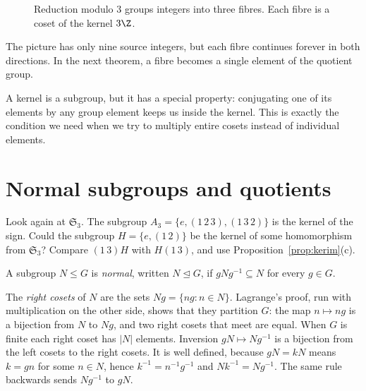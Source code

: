 \begin{figure}[ht]
\centering
{}
\caption{Reduction modulo $3$ groups integers into three fibres. Each fibre is a coset of the kernel $3\Z$.}
\label{fig:kernel-fibres}
\end{figure}

The picture has only nine source integers, but each fibre continues forever in both directions. In the next theorem, a fibre becomes a single element of the quotient group.

A kernel is a subgroup, but it has a special property: conjugating one of its elements by any group element keeps us inside the kernel. This is exactly the condition we need when we try to multiply entire cosets instead of individual elements.

\section{Normal subgroups and quotients}

\begin{think}
Look again at $\mathfrak S_3$. The subgroup $A_3=\{e,(1\,2\,3),(1\,3\,2)\}$ is the kernel of the sign. Could the subgroup $H=\{e,(1\,2)\}$ be the kernel of some homomorphism from $\mathfrak S_3$? Compare $(1\,3)H$ with $H(1\,3)$, and use Proposition~\ref{prop:kerim}(c).
\end{think}

\begin{definition}
A subgroup $N\le G$ is \emph{normal}, written $N\trianglelefteq G$, if $gNg^{-1}\subseteq N$ for every $g\in G$.
\end{definition}

The \emph{right cosets} of $N$ are the sets $Ng=\{ng:n\in N\}$. Lagrange's proof, run with multiplication on the other side, shows that they partition $G$: the map $n\mapsto ng$ is a bijection from $N$ to $Ng$, and two right cosets that meet are equal. When $G$ is finite each right coset has $|N|$ elements. Inversion $gN\mapsto Ng^{-1}$ is a bijection from the left cosets to the right cosets. It is well defined, because $gN=kN$ means $k=gn$ for some $n\in N$, hence $k^{-1}=n^{-1}g^{-1}$ and $Nk^{-1}=Ng^{-1}$. The same rule backwards sends $Ng^{-1}$ to $gN$.

